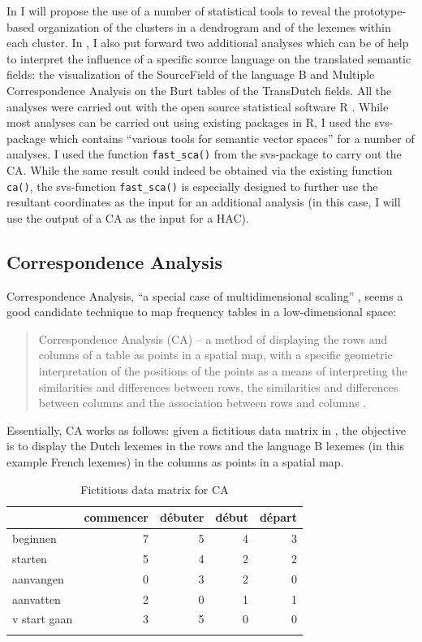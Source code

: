 In  I will propose the use of a number of statistical tools to reveal the prototype-based organization of the clusters in a dendrogram and of the lexemes within each cluster. In , I also put forward two additional analyses which can be of help to interpret the influence of a specific source language on the translated semantic fields: the visualization of the SourceField of the language B and Multiple Correspondence Analysis on the Burt tables of the TransDutch fields. All the analyses were carried out with the open source statistical software R \citep{r_core_r:_2014}. While most analyses can be carried out using existing packages in R, I used the svs{}-package \citep{plevoets_svs:_2015} which contains “various tools for semantic vector spaces” for a number of analyses. I used the function \texttt{fast\_sca()} from the svs{}-package to carry out the CA. While the same result could indeed be obtained via the existing function \texttt{ca()}, the svs{}-function \texttt{fast\_sca()} is especially designed to further use the resultant coordinates as the input for an additional analysis (in this case, I will use the output of a CA as the input for a HAC).


\subsection{Correspondence Analysis}
\label{sec:3.7.1}  
Correspondence Analysis, “a special case of multidimensional scaling” \citep[136]{baayen_analyzing_2008}, seems a good candidate technique to map frequency tables in a low-dimensional space:

\begin{quote}
Correspondence Analysis (CA) – a method of displaying the rows and columns of a table as points in a spatial map, with a specific geometric interpretation of the positions of the points as a means of interpreting the similarities and differences between rows, the similarities and differences between columns and the association between rows and columns \citep[264]{greenacre_correspondence_2007}.
\end{quote}

Essentially, CA works as follows: given a fictitious data matrix in , the objective is to display the Dutch lexemes in the rows and the language B lexemes (in this example French lexemes) in the columns as points in a spatial map.

\begin{table}\caption{Fictitious data matrix for CA\label{tab:3:12}}
\begin{tabular}{lrrrr}
\lsptoprule
& commencer & d\'{e}buter & d\'ebut & d\'epart\\\midrule
beginnen     & 7 & 5 & 4 & 3\\
starten      & 5 & 4 & 2 & 2\\
aanvangen    & 0 & 3 & 2 & 0\\
aanvatten    & 2 & 0 & 1 & 1\\
v start gaan & 3 & 5 & 0 & 0\\
\lspbottomrule
\end{tabular}
\end{table}

